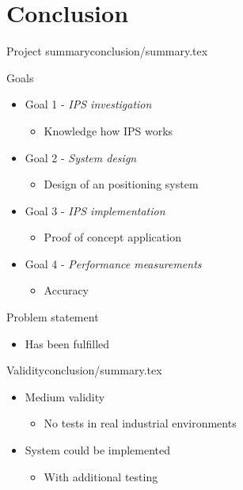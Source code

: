 \section{Conclusion}

\begin{notedFrame}{Project summary}{conclusion/summary.tex}
\begin{block}{Goals}

\begin{itemize}
    \item Goal 1 - \textit{IPS investigation}
    \begin{itemize}
        \item Knowledge how IPS works
    \end{itemize}
    
    \item Goal 2 - \textit{System design}
    \begin{itemize}
        \item Design of an positioning system
    \end{itemize}
    
    \item Goal 3 - \textit{IPS implementation}
    \begin{itemize}
        \item Proof of concept application
    \end{itemize}
    
    \item Goal 4 - \textit{Performance measurements}
    \begin{itemize}
        \item Accuracy
    \end{itemize}
\end{itemize}
\end{block}

\begin{block}{Problem statement}
\begin{itemize}
        \item Has been fulfilled
    \end{itemize}
\end{block}
\end{notedFrame}


\begin{notedFrame}{Validity}{conclusion/summary.tex}
\begin{itemize}
    \item Medium validity
    \begin{itemize}
        \item No tests in real industrial environments
    \end{itemize}
    \item System could be implemented
    \begin{itemize}
        \item With additional testing
    \end{itemize}
\end{itemize}
\end{notedFrame}
